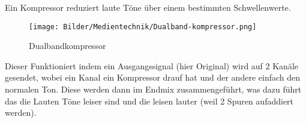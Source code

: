 Ein Kompressor reduziert laute Töne über einem bestimmten Schwellenwerte.

\begin{figure}[h]
    \centering
    \texttt{[image: Bilder/Medientechnik/Dualband-kompressor.png]}
    \caption{Dualbandkompressor}
    \label{fig:Dualband-Kompressor}
\end{figure}
Dieser Funktioniert indem ein Ausgangssignal (hier Original) wird auf 2 Kanäle gesendet, wobei ein Kanal ein Kompressor drauf hat und der andere  einfach den normalen Ton.  Diese werden dann im Endmix zusammengeführt, was dazu führt das die Lauten Töne leiser sind und die leisen lauter (weil 2 Spuren aufaddiert werden).